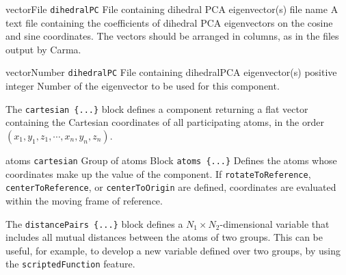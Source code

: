 {\begin{cvcoptions}

\item %

\item %

\item %
  \key
    {vectorFile}{%
    \texttt{dihedralPC}}{%
    File containing dihedral PCA eigenvector(s)}{%
    file name}{%
    A text file containing the coefficients of dihedral PCA eigenvectors on the
    cosine and sine coordinates. The vectors should be arranged in columns,
    as in the files output by Carma.\cite{Glykos2006}}

\item %
  \key
    {vectorNumber}{%
    \texttt{dihedralPC}}{%
    File containing dihedralPCA eigenvector(s)}{%
    positive integer}{%
    Number of the eigenvector to be used for this component.}
\end{cvcoptions}

} %




The \texttt{cartesian~\{...\}} block defines a component returning a flat vector containing
the Cartesian coordinates of all participating atoms, in the order
$(x_1, y_1, z_1, \cdots, x_n, y_n, z_n)$.

\begin{cvcoptions}
\item %
  \key
    {atoms}{%
    \texttt{cartesian}}{%
    Group of atoms}{%
    Block \texttt{atoms \{...\}}}{%
    Defines the atoms whose coordinates make up the value of the component.
    If \texttt{rotateToReference}, \texttt{centerToReference}, or \texttt{centerToOrigin} are defined, coordinates
    are evaluated within the moving frame of reference.}
\end{cvcoptions}



The \texttt{distancePairs~\{...\}} block defines a $N_{\mathrm{1}}\times{}N_{\mathrm{2}}$-dimensional variable that includes all mutual distances between the atoms of two groups.
This can be useful, for example, to develop a new variable defined over two groups, by using the \texttt{scriptedFunction} feature.

